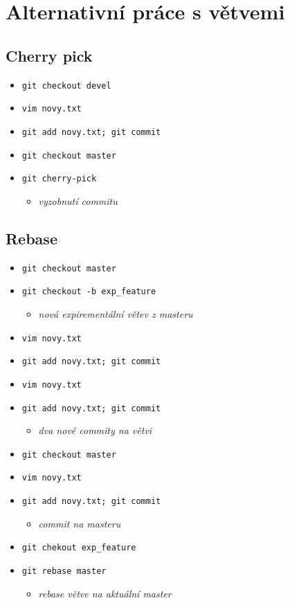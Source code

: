 \documentclass[10pt,twocolumn]{article}
\begin{document}
\section{Alternativní práce s větvemi}

\subsection{Cherry pick}

\begin{itemize}
  \item \texttt{git checkout devel}
  \item \texttt{vim novy.txt}
  \item \texttt{git add novy.txt; git commit}
  \item \texttt{git checkout master}
  \item \texttt{git cherry-pick}
  \begin{itemize} \item \textit{vyzobnutí commitu} \end{itemize}
\end{itemize}

\subsection{Rebase}

\begin{itemize}
	\item \texttt{git checkout master}
	\item \texttt{git checkout -b exp\_feature}
	\begin{itemize} \item \textit{nová expirementální větev z masteru} \end{itemize}
	\item \texttt{vim novy.txt}
	\item \texttt{git add novy.txt; git commit}
	\item \texttt{vim novy.txt}
	\item \texttt{git add novy.txt; git commit}
	\begin{itemize} \item \textit{dva nové commity na větvi} \end{itemize}
	\item \texttt{git checkout master}
	\item \texttt{vim novy.txt}
	\item \texttt{git add novy.txt; git commit}
	\begin{itemize} \item \textit{commit na masteru} \end{itemize}
	\item \texttt{git chekout exp\_feature}
	\item \texttt{git rebase master}
	\begin{itemize} \item \textit{rebase větve na aktuální master} \end{itemize}
\end{itemize}
\end{document}
